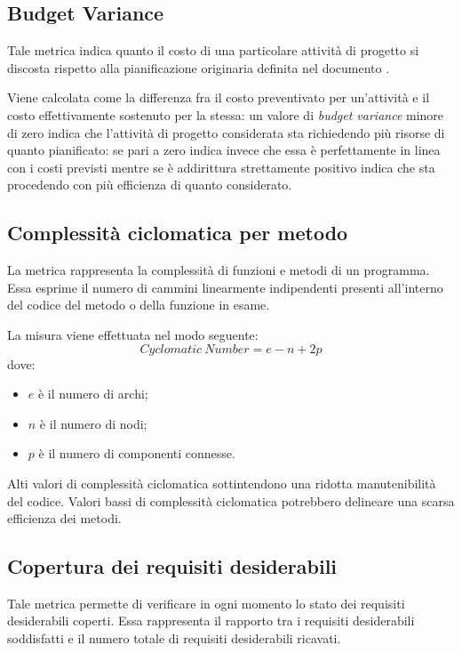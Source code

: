 \subsection{Budget Variance}
Tale metrica indica quanto il costo di una particolare attività di progetto si discosta rispetto alla pianificazione originaria definita nel documento \PdP. 

Viene calcolata come la differenza fra il costo preventivato per un'attività e il costo effettivamente sostenuto per la stessa: un valore di \emph{budget variance} minore di zero indica che l'attività di progetto considerata sta richiedendo più risorse di quanto pianificato: se pari a zero indica invece che essa è perfettamente in linea con i costi previsti mentre se è addirittura strettamente positivo indica che sta procedendo con più efficienza di quanto considerato.


\subsection{Complessità ciclomatica per metodo}
La metrica rappresenta la complessità di funzioni e metodi di un programma. Essa esprime il numero di cammini linearmente indipendenti presenti all'interno del codice del metodo o della funzione in esame. 

La misura viene effettuata nel modo seguente:
\begin{equation}
	Cyclomatic \ Number = e - n + 2p
\end{equation}
dove:
\begin{itemize}
	\item $e$ è il numero di archi;
	\item $n$ è il numero di nodi;
	\item $p$ è il numero di componenti connesse.
\end{itemize}
Alti valori di complessità ciclomatica sottintendono una ridotta manutenibilità del codice. Valori bassi di complessità ciclomatica potrebbero delineare una scarsa efficienza dei metodi.


\subsection{Copertura dei requisiti desiderabili}
Tale metrica permette di verificare in ogni momento lo stato dei requisiti desiderabili coperti. Essa rappresenta il rapporto tra i requisiti desiderabili soddisfatti e il numero totale di requisiti desiderabili ricavati.

